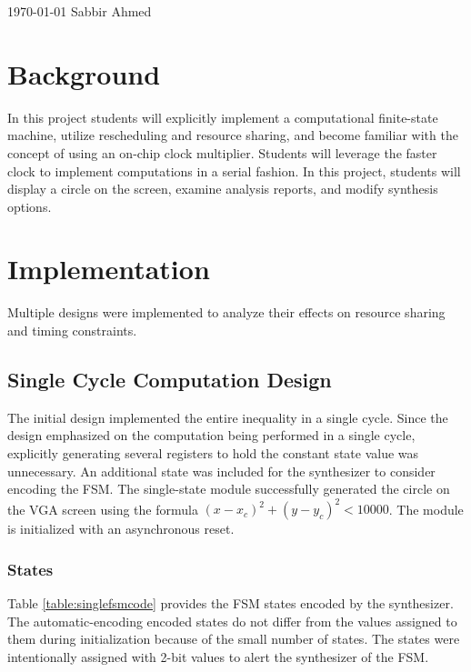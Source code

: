 \documentclass[paper=usletter, fontsize=12pt]{article}
\begin{document}
    {\today} {Sabbir Ahmed}
    \vspace{-0.1in}

    \section{Background} In this project students will explicitly implement a
    computational finite-state machine, utilize rescheduling and resource
    sharing, and become familiar with the concept of using an on-chip clock
    multiplier. Students will leverage the faster clock to implement
    computations in a serial fashion. In this project, students will display a
    circle on the screen, examine analysis reports, and modify synthesis
    options.

    \section{Implementation} Multiple designs were implemented to analyze their
    effects on resource sharing and timing constraints.

        \subsection{Single Cycle Computation Design} The initial design
        implemented the entire inequality in a single cycle. Since the design
        emphasized on the computation being performed in a single cycle,
        explicitly generating several registers to hold the constant state
        value was unnecessary. An additional state was included for the
        synthesizer to consider encoding the FSM. The single-state module
        successfully generated the circle on the VGA screen using the formula
        $(x - x_c)^2 + (y - y_c)^2 < 10000$. The module is initialized with an
        asynchronous reset.

        \subsubsection{States} Table \ref{table:singlefsmcode} provides the FSM
        states encoded by the synthesizer. The automatic-encoding encoded
        states do not differ from the values assigned to them during
        initialization because of the small number of states. The states were
        intentionally assigned with 2-bit values to alert the synthesizer of
        the FSM.
\end{document}
